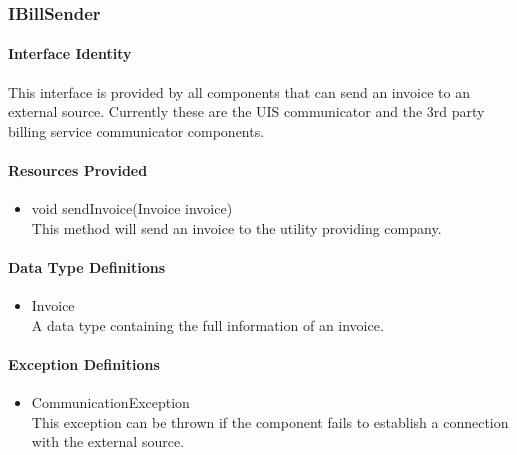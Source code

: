 \subsubsection{IBillSender}
\paragraph{Interface Identity}
This interface is provided by all components that can send an
	invoice to an external source. Currently these are the UIS
	communicator and the 3rd party billing service communicator
	components.
\paragraph{Resources Provided}
\begin{itemize}
	\item{void sendInvoice(Invoice invoice)}\\
	This method will send an invoice to the utility providing company.
\end{itemize}
\paragraph{Data Type Definitions}
\begin{itemize}
	\item Invoice\\
	A data type containing the full information of an invoice.
\end{itemize}
\paragraph{Exception Definitions}
\begin{itemize}
	\item CommunicationException\\
	This exception can be thrown if the component fails to establish a connection with
		the external source.
\end{itemize}